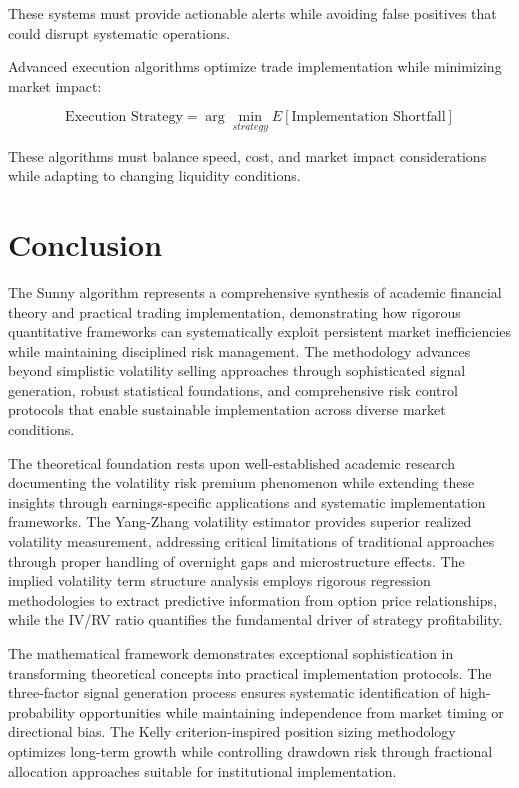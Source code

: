 \documentclass[
  american,
  11pt,
  11pt,
  letterpaper,
  onecolumn]{article}
\begin{document}
These systems must provide actionable alerts while avoiding false
positives that could disrupt systematic operations.

Advanced execution algorithms optimize trade implementation while
minimizing market impact:

\[\text{Execution Strategy} = \arg\min_{strategy} E[\text{Implementation Shortfall}]\]

These algorithms must balance speed, cost, and market impact
considerations while adapting to changing liquidity conditions.

\section{Conclusion}\label{conclusion}

The Sunny algorithm represents a comprehensive synthesis of academic
financial theory and practical trading implementation, demonstrating how
rigorous quantitative frameworks can systematically exploit persistent
market inefficiencies while maintaining disciplined risk management. The
methodology advances beyond simplistic volatility selling approaches
through sophisticated signal generation, robust statistical foundations,
and comprehensive risk control protocols that enable sustainable
implementation across diverse market conditions.

The theoretical foundation rests upon well-established academic research
documenting the volatility risk premium phenomenon while extending these
insights through earnings-specific applications and systematic
implementation frameworks. The Yang-Zhang volatility estimator provides
superior realized volatility measurement, addressing critical
limitations of traditional approaches through proper handling of
overnight gaps and microstructure effects. The implied volatility term
structure analysis employs rigorous regression methodologies to extract
predictive information from option price relationships, while the IV/RV
ratio quantifies the fundamental driver of strategy profitability.

The mathematical framework demonstrates exceptional sophistication in
transforming theoretical concepts into practical implementation
protocols. The three-factor signal generation process ensures systematic
identification of high-probability opportunities while maintaining
independence from market timing or directional bias. The Kelly
criterion-inspired position sizing methodology optimizes long-term
growth while controlling drawdown risk through fractional allocation
approaches suitable for institutional implementation.
\end{document}
